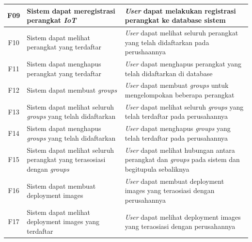 \begin{table}
\begin{tabular}{|c|p{4.5cm}|p{8cm}|}
    \hline
    F09 & Sistem dapat meregistrasi perangkat \textit{IoT}                 & \textit{User} dapat melakukan registrasi perangkat ke database sistem                 \\
    \hline
    F10 & Sistem dapat melihat perangkat yang terdaftar                                  & \textit{User} dapat melihat seluruh perangkat yang telah didaftarkan pada perushaannya                          \\
    \hline
    F11 & Sistem dapat menghapus perangkat yang terdaftar                                & \textit{User} dapat menghapus perangkat yang telah didaftarkan di database                                      \\
    \hline
    F12 & Sistem dapat membuat \textit{groups}                                           & \textit{User} dapat membuat \textit{groups} untuk mengelompokan beberapa perangkat                              \\
    \hline
    F13 & Sistem dapat melihat seluruh \textit{groups} yang telah didaftarkan            & \textit{User} dapat melihat seluruh \textit{groups} yang telah terdaftar pada perusahannya                      \\
    \hline
    F14 & Sistem dapat menghapus \textit{groups} yang telah didaftarkan                  & \textit{User} dapat menghapus \textit{groups} yang telah terdaftar pada perusahannya                            \\
    \hline
    F15 & Sistem dapat melihat seluruh perangkat yang terasosiasi dengan \textit{groups} & \textit{User} dapat melihat hubungan antara perangkat dan \textit{groups} pada sistem dan begitupula sebaliknya \\
    \hline
    F16 & Sistem dapat membuat deployment images                                         & \textit{User} dapat membuat deployment images yang teraosiasi dengan perusahannya                               \\
    \hline
    F17 & Sistem dapat melihat deployment images yang terdaftar                          & \textit{User} dapat melihat deployment images yang teraosiasi dengan perusahannya                               \\
    \hline
  \end{tabular}
\end{table}

